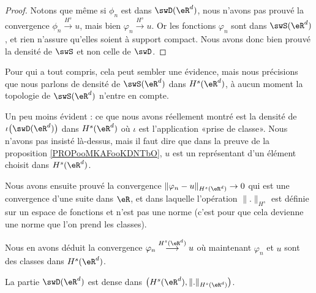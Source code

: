 \begin{proof}
    Notons que même si \( \phi_n\) est dans \( \swD(\eR^d)\), nous n'avons pas prouvé la convergence \( \phi_n\stackrel{H^s}{\longrightarrow}u\), mais bien \( \varphi_n\stackrel{H^s}{\longrightarrow}u\). Or les fonctions \( \varphi_n\) sont dans \( \swS(\eR^d)\), et rien n'assure qu'elles soient à support compact. Nous avons donc bien prouvé la densité de \( \swS\) et non celle de \( \swD\).
\end{proof}

\begin{remark}
    Pour qui a tout compris, cela peut sembler une évidence, mais nous précisions que nous parlons de densité de \( \swS(\eR^d)\) dans \( H^s(\eR^d)\), à aucun moment la topologie de \( \swS(\eR^d)\) n'entre en compte.

    Un peu moins évident : ce que nous avons réellement montré est la densité de \( \iota\big( \swD(\eR^d) \big)\) dans \( H^s(\eR^d)\) où \( \iota\) est l'application «prise de classe». Nous n'avons pas insisté là-dessus, mais il faut dire que dans la preuve de la proposition \ref{PROPooMKAFooKDNTbO}, \( u\) est un représentant d'un élément choisit dans \( H^s(\eR^d)\). 
    
    Nous avons ensuite prouvé la convergence \( \| \varphi_n-u \|_{H^s(\eR^d)}\to 0\) qui est une convergence d'une suite dans \( \eR\), et dans laquelle l'opération \( \| . \|_{H^s}\) est définie sur un espace de fonctions et n'est pas une norme (c'est pour que cela devienne une norme que l'on prend les classes).
    
    Nous en avons déduit la convergence \( \varphi_n\stackrel{H^s(\eR^d)}{\longrightarrow}u\) où maintenant \( \varphi_n\) et \( u\) sont des classes dans \( H^s(\eR^d)\).
\end{remark}

\begin{proposition}     \label{PROPooLIQJooKpWtnV}
    La partie \( \swD(\eR^d)\) est dense dans \( \big( H^s(\eR^d),\| . \|_{H^s(\eR^d)} \big)\).
\end{proposition}

